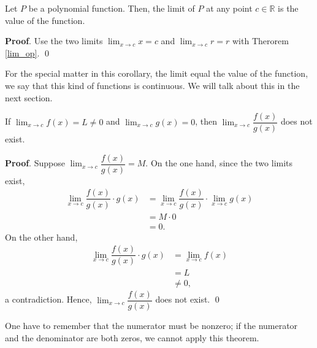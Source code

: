 \documentclass[11pt]{book}
\theoremstyle{break}
\theoremstyle{no_label}
\newcommand{\bbR}{\mathbb{R}}
\numberwithin{equation}{section}
\begin{document}
\begin{corollary}
    Let $P$ be a polynomial function. Then, the limit of $P$ at any point $c\in\bbR$ is the value of the function.
\end{corollary}
\textbf{Proof}. Use the two limits $\displaystyle\lim_{x\to c}x=c$ and $\displaystyle\lim_{x\to c}r=r$ with Therorem \ref{lim_op}. \qed

For the special matter in this corollary, the limit equal the value of the function, we say that this kind of functions is continuous. We will talk about this in the next section.

\begin{theorem}
    If $\displaystyle\lim_{x\to c}f(x)=L\ne 0$ and $\displaystyle\lim_{x\to c}g(x)=0$, then $\displaystyle\lim_{x\to c}\dfrac{f(x)}{g(x)}$ does not exist.
\end{theorem}
\textbf{Proof}. Suppose $\displaystyle\lim_{x\to c}\dfrac{f(x)}{g(x)}=M$. On the one hand, since the two limits exist, \begin{align*}
    \lim_{x\to c}\dfrac{f(x)}{g(x)}\cdot g(x)&=\lim_{x\to c}\dfrac{f(x)}{g(x)}\cdot\lim_{x\to c}g(x)\\
    &=M\cdot 0\\
    &=0.
\end{align*} On the other hand, \begin{align*}
    \lim_{x\to c}\dfrac{f(x)}{g(x)}\cdot g(x)&=\lim_{x\to c}f(x)\\
    &=L\\
    &\ne0,
\end{align*} a contradiction. Hence, $\displaystyle\lim_{x\to c}\dfrac{f(x)}{g(x)}$ does not exist. \qed

One have to remember that the numerator must be nonzero; if the numerator and the denominator are both zeros, we cannot apply this theorem.
\end{document}
